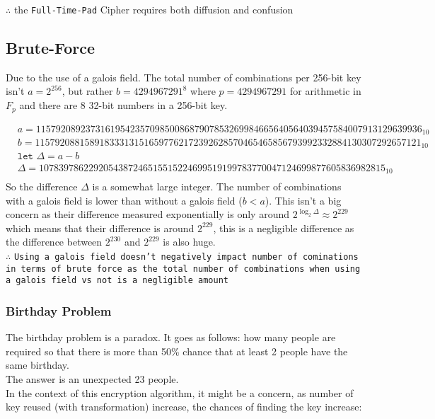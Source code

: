 \documentclass[fleqn, a4paper,12pt]{article}
\begin{document}
$\therefore$ the \texttt{Full-Time-Pad} Cipher requires both diffusion and confusion

\subsection{Brute-Force}

Due to the use of a galois field. The total number of combinations per 256-bit key isn't $a=2^{256}$, but rather $b=4294967291^8$ where $p=4294967291$ for arithmetic in $F_p$ and there are 8 32-bit numbers in a 256-bit key.

\[
\begin{aligned}
&a = 115792089237316195423570985008687907853269984665640564039457584007913129639936_{10} \\
&b = 115792088158918333131516597762172392628570465465856793992332884130307292657121_{10} \\
&\texttt{let  } \Delta = a-b \\
&\Delta = 1078397862292054387246515515224699519199783770047124699877605836982815_{10} \\
\end{aligned}
\]
So the difference $\Delta$ is a somewhat large integer. The number of combinations with a galois field is lower than without a galois field ($b < a$). This isn't a big concern as their difference measured exponentially is only around $2^{\log_2\Delta} \approx 2^{229}$ which means that their difference is around $2^{229}$, this is a negligible difference as the difference between $2^{230}$ and $2^{229}$ is also huge. \\
$\therefore $ \texttt{Using a galois field doesn't negatively impact number of cominations in terms of brute force as the total number of combinations when using a galois field vs not is a negligible amount}

\subsubsection {Birthday Problem} \label{birthday_problem}

The birthday problem is a paradox. It goes as follows: how many people are required so that there is more than 50\% chance that at least 2 people have the same birthday.
\\
The answer is an unexpected 23 people.
\\
In the context of this encryption algorithm, it might be a concern, as number of key reused (with transformation) increase, the chances of finding the key increase:
\\
\\
\end{document}
